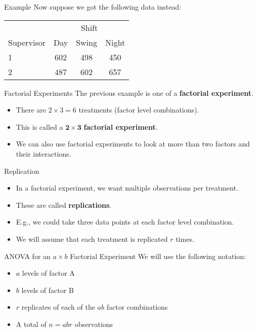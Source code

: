 \begin{frame}{Example}
    Now suppose we got the following data instead:
    \begin{table}[h]
        \centering
        \begin{tabular}{lccc}
             & \multicolumn{3}{c}{Shift} \\
            \cline{2-4}
            Supervisor & Day & Swing & Night \\
            \hline
            1 & 602 & 498 & 450 \\
            2 & 487 & 602 & 657 \\
            \hline
        \end{tabular}
    \end{table}
\end{frame}

\begin{frame}{Factorial Experiments}
    The previous example is one of a \textbf{factorial experiment}.
    \begin{itemize}
        \item There are $2\times3=6$ treatments (factor level combinations).
        \item This is called a $\boldsymbol{2\times3}$ \textbf{factorial experiment}.
        \item We can also use factorial experiments to look at more than two factors and their interactions.
    \end{itemize}
\end{frame}

\begin{frame}{Replication}
    \begin{itemize}
        \item In a factorial experiment, we want multiple observations per treatment.
        \item These are called \textbf{replications}.
        \item E.g., we could take three data points at each factor level combination.
        \item We will assume that each treatment is replicated $r$ times.
    \end{itemize}
\end{frame}

\begin{frame}{ANOVA for an $a\times b$ Factorial Experiment}
    We will use the following notation:
    \begin{itemize}
        \item $a$ levels of factor A
        \item $b$ levels of factor B
        \item $r$ replicates of each of the $ab$ factor combinations
        \item A total of $n=abr$ observations
    \end{itemize}
\end{frame}

